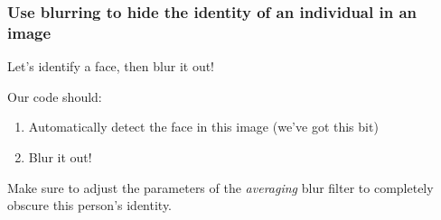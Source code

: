 \documentclass[11pt]{article}
\begin{document}
    \subsubsection{Use blurring to hide the identity of an individual in an
image}\label{use-blurring-to-hide-the-identity-of-an-individual-in-an-image}

Let's identify a face, then blur it out!

Our code should:

\begin{enumerate}
\def\labelenumi{\arabic{enumi})}
\item
  Automatically detect the face in this image (we've got this bit)
\item
  Blur it out!
\end{enumerate}

Make sure to adjust the parameters of the \emph{averaging} blur filter
to completely obscure this person's identity.
\end{document}

